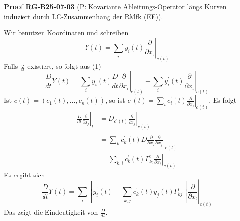 \documentclass[10pt, letterpaper]{article}
\newcommand{\CustomHeading}[3]{%
  \par\medskip\noindent%
  \textbf{#1 #2} \textnormal{(#3)}.\enskip%
}
\newenvironment{PROOF}[2]{\begin{unitbox}\CustomHeading{Proof}{#1}{#2}}{\end{unitbox}}
\begin{document}
\begin{PROOF}{RG-B25-07-03}{P: Kovariante Ableitungs-Operator längs Kurven induziert durch LC-Zusammenhang der RMfk (EE)}
Wir benutzen Koordinaten und schreiben
$$
Y(t)=\left.\sum_{i} y_{i}(t) \frac{\partial}{\partial x_{i}}\right|_{c(t)}
$$
Falls $\frac{D}{d t}$ existiert, so folgt aus (1)
$$
\frac{D}{d t} Y(t)=\left.\sum_{i} y_{i}(t) \frac{D}{d t} \frac{\partial}{\partial x_{i}}\right|_{c(t)}+\left.\sum_{i} y_{i}^{\prime}(t) \frac{\partial}{\partial x_{i}}\right|_{c(t)}
$$
Ist $c(t)=\left(c_{1}(t), \ldots, c_{n}(t)\right)$, so ist $c^{\prime}(t)=\left.\sum_{i} c_{i}^{\prime}(t) \frac{\partial}{\partial x_{i}}\right|_{c(t)}$. Es folgt
$$
\begin{aligned}
\left.\frac{D}{d t} \frac{\partial}{\partial x_{j}}\right|_{t} & =\left.D_{c^{\prime}(t)} \frac{\partial}{\partial x_{j}}\right|_{c(t)} \\
& =\left.\sum_{k} c_{k}^{\prime}(t) D \frac{\partial}{\partial x_{k}} \frac{\partial}{\partial x_{j}}\right|_{c(t)} \\
& =\left.\sum_{k, i} c_{k}^{\prime}(t) \Gamma_{k j}^{i} \frac{\partial}{\partial x_{i}}\right|_{c(t)}
\end{aligned}
$$
Es ergibt sich
\begin{equation*}
\frac{D}{d t} Y(t)=\left.\sum_{i}\left[y_{i}^{\prime}(t)+\sum_{k, j} c_{k}^{\prime}(t) y_{j}(t) \Gamma_{k j}^{i}\right] \frac{\partial}{\partial x_{i}}\right|_{c(t)} \tag{4}
\end{equation*}
Das zeigt die Eindeutigkeit von $\frac{D}{d t}$. 


\end{PROOF}
\end{document}
